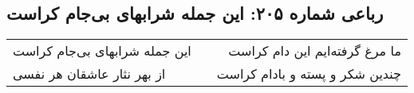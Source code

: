 \begin{center}
\section*{رباعی شماره ۲۰۵: این جمله شرابهای بی‌جام کراست}
\label{sec:0205}
\begin{longtable}{l p{0.5cm} r}
این جمله شرابهای بی‌جام کراست
&&
ما مرغ گرفته‌ایم این دام کراست
\\
از بهر نثار عاشقان هر نفسی
&&
چندین شکر و پسته و بادام کراست
\\
\end{longtable}
\end{center}
